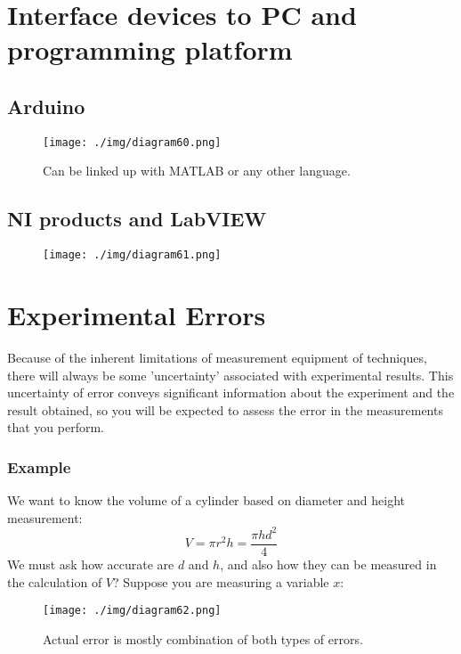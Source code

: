 \section{Interface devices to PC and programming platform}
\subsection{Arduino}
\begin{figure}[H]
  \centering
  \texttt{[image: ./img/diagram60.png]}
  \caption{Can be linked up with MATLAB or any other language.}
\end{figure}
\subsection{NI products and LabVIEW}
\begin{figure}[H]
  \centering
  \texttt{[image: ./img/diagram61.png]}
\end{figure}
\section{Experimental Errors}
Because of the inherent limitations of measurement equipment of techniques, there will always be some 'uncertainty' associated with experimental results. This uncertainty of error conveys significant information about the experiment and the result obtained, so you will be expected to assess the error in the measurements that you perform.
\subsubsection*{Example}
We want to know the volume of a cylinder based on diameter and height measurement:
\begin{equation}
  V = \pi r^2 h = \frac{\pi h d^2}{4}
\end{equation}
We must ask how accurate are $d$ and $h$, and also how they can be measured in the calculation of $V$? Suppose you are measuring a variable $x$:
\begin{figure}[H]
  \centering
  \texttt{[image: ./img/diagram62.png]}
  \caption{Actual error is mostly combination of both types of errors.}
\end{figure}
